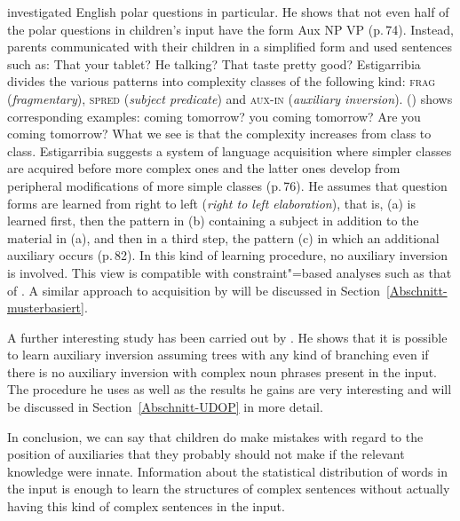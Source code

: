 \citet{Estigarribia2010a} investigated English polar questions in particular. He shows that not even half of the polar questions in children's input have
 the form Aux NP VP (p.\,74).
Instead, parents communicated with their children in a simplified form and used sentences such as:
\eal
\ex That your tablet?
\ex He talking?
\ex That taste pretty good?
\zl
Estigarribia divides the various patterns into complexity classes of the following kind:
\textsc{frag}
(\emph{fragmentary}), \textsc{spred} (\emph{subject predicate}) and \textsc{aux-in} (\emph{auxiliary
  inversion}). () shows corresponding examples:
\eal\settowidth{}
\ex coming tomorrow?         
\ex you coming tomorrow?     
\ex Are you coming tomorrow? 
\zl
What we see is that the complexity increases from class to class. Estigarribia suggests a system of language
acquisition where simpler classes are acquired before more complex ones and the latter ones develop from peripheral
modifications of more simple classes
(p.\,76). He assumes that question forms are learned from right to left
 (\emph{right to left elaboration}), that is, (a) is learned first, then the pattern in (b) containing a subject in addition to the material in (a), and
 then in a third step, the pattern (c) in which an additional auxiliary occurs (p.\,82). 
In this kind of learning procedure, no auxiliary inversion is involved. This view is compatible with constraint"=based analyses such as that of
 \citet{GSag2000a-u}. 
A similar approach to acquisition by \citet*{FPAG2007a} will be discussed in Section~\ref{Abschnitt-musterbasiert}.

A further interesting study has been carried out by \citet{Bod2009a}. He shows that it is possible to learn auxiliary inversion
assuming trees with any kind of branching even if there is no auxiliary inversion with complex noun phrases present
in the input. The procedure he uses as well as the results he gains are very interesting and will be discussed 
in Section~\ref{Abschnitt-UDOP} in more detail.

In conclusion, we can say that children do make mistakes with regard to the position of auxiliaries that they
probably should not make if the relevant knowledge were innate. Information about the statistical
distribution of words in the input is enough to learn the structures of complex sentences without
actually having this kind of complex sentences in the input.%

